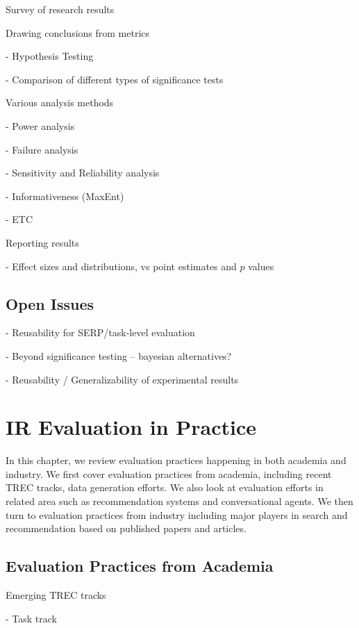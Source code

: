 \documentclass[openany]{now} %
\newcommand{\newpar}{\bigskip\noindent}
\begin{document}
Survey of research results \cite{Sakai:2016}

Drawing conclusions from metrics 

- Hypothesis Testing \cite{Dincer:2014}

- Comparison of different types of significance tests \cite{SmuckerAC09}

\newpar
Various analysis methods

- Power analysis \cite{Sakai:2014}

- Failure analysis

- Sensitivity and Reliability analysis \cite{Urbano:2013} 

- Informativeness (MaxEnt) \cite{AslamYP05}

- ETC \cite{Bron:2013} \cite{Boytsov:2013}  \cite{Robertson:2012}

\newpar
Reporting results

- Effect sizes and distributions, vs point estimates and $p$ values

\section{Open Issues}

- Reusability for SERP/task-level evaluation

- Beyond significance testing -- bayesian alternatives?

- Reusability / Generalizability of experimental results


\chapter{IR Evaluation in Practice}
\label{c-practice}

In this chapter, we review evaluation practices happening in both academia and industry. We first cover evaluation practices from academia, including recent TREC tracks, data generation efforts. We also look at evaluation efforts in related area such as recommendation systems and conversational agents. We then turn to evaluation practices from industry including major players in search and recommendation based on published papers and articles.

\section{Evaluation Practices from Academia}

Emerging TREC tracks

- Task track
\end{document}
